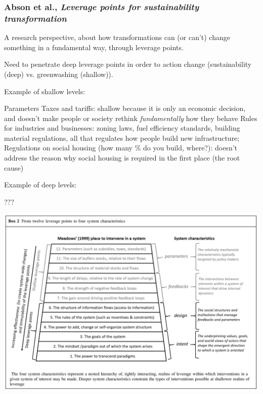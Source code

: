 \documentclass{article}
\begin{document}
\subsubsection{Abson et al., \textit{Leverage points for sustainability transformation}}

A research perspective, about how transformations can (or can't) change something in a fundamental way, through leverage points.

Need to penetrate deep leverage points in order to action change (sustainability (deep) vs. greenwashing (shallow)).

Example of shallow levels: 
\begin{outline}
	\1 Parameters
		\2 Taxes and tariffs: shallow because it is only an economic decision, and doesn't make people or society rethink \textit{fundamentally} how they behave
		\2 Rules for industries and businesses: zoning laws, fuel efficiency standards, building material regulations, all that regulates how people build new infrastructure;
		\2 Regulations on social housing (how many \% do you build, where?): doesn't address the reason why social housing is required in the first place (the root cause)
\end{outline}

Example of deep levels: 
\begin{outline}
	\1 ???
\end{outline}

\includegraphics[width=\textwidth]{leverage_points}

\end{document}
